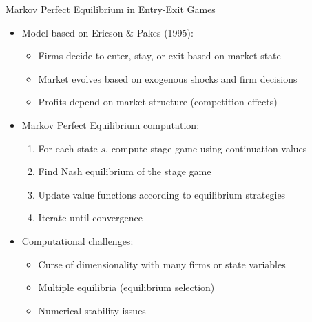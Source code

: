 \documentclass[10pt]{beamer}
\begin{document}
\begin{frame}{Markov Perfect Equilibrium in Entry-Exit Games}
    \begin{itemize}
        \item Model based on Ericson \& Pakes (1995):
        \begin{itemize}
            \item Firms decide to enter, stay, or exit based on market state
            \item Market evolves based on exogenous shocks and firm decisions
            \item Profits depend on market structure (competition effects)
        \end{itemize}
        \vspace{0.2cm}
        \item Markov Perfect Equilibrium computation:
        \begin{enumerate}
            \item For each state $s$, compute stage game using continuation values
            \item Find Nash equilibrium of the stage game
            \item Update value functions according to equilibrium strategies
            \item Iterate until convergence
        \end{enumerate}
        \vspace{0.2cm}
        \item Computational challenges:
        \begin{itemize}
            \item Curse of dimensionality with many firms or state variables
            \item Multiple equilibria (equilibrium selection)
            \item Numerical stability issues
        \end{itemize}
    \end{itemize}
\end{frame}
\end{document}
